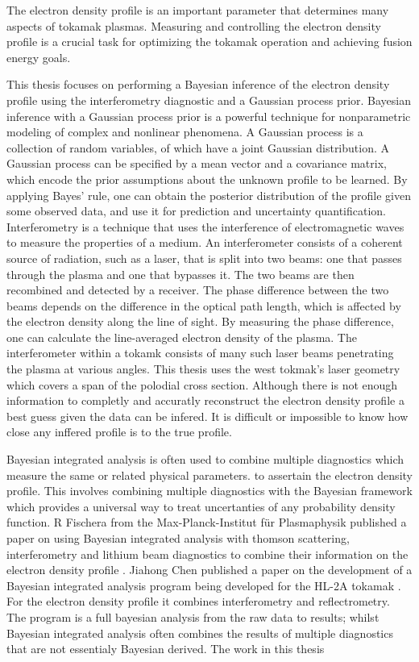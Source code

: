 The electron density profile is an important parameter that determines many aspects of tokamak plasmas. Measuring and controlling the electron density profile is a crucial task for optimizing the tokamak operation and achieving fusion energy goals.

This thesis focuses on performing a Bayesian inference of the electron density profile using the interferometry diagnostic and a Gaussian process prior. Bayesian inference with a Gaussian process prior is a powerful technique for nonparametric modeling of complex and nonlinear phenomena. A Gaussian process is a collection of random variables, of which have a joint Gaussian distribution. A Gaussian process can be specified by a mean vector and a covariance matrix, which encode the prior assumptions about the unknown profile to be learned. By applying Bayes’ rule, one can obtain the posterior distribution of the profile given some observed data, and use it for prediction and uncertainty quantification. Interferometry is a technique that uses the interference of electromagnetic waves to measure the properties of a medium. An interferometer consists of a coherent source of radiation, such as a laser, that is split into two beams: one that passes through the plasma and one that bypasses it. The two beams are then recombined and detected by a receiver. The phase difference between the two beams depends on the difference in the optical path length, which is affected by the electron density along the line of sight. By measuring the phase difference, one can calculate the line-averaged electron density of the plasma. The interferometer within a tokamk consists of many such laser beams penetrating the plasma at various angles. This thesis uses the \gls{west} tokmak's laser geometry which covers a span of the polodial cross section. Although there is not enough information to completly and accuratly reconstruct the electron density profile a best guess given the data can be infered. It is difficult or impossible to know how close any inffered profile is to the true profile.

Bayesian integrated analysis is often used to combine multiple diagnostics which measure the same or related physical parameters. to assertain the electron density profile. This involves combining multiple diagnostics with the Bayesian framework which provides a universal way to treat uncertanties of any probability density function. R Fischera from the Max-Planck-Institut für Plasmaphysik published a paper on using Bayesian integrated analysis with thomson scattering, interferometry and lithium beam diagnostics to combine their information on the electron density profile \cite{IDAmaxPlanck}. Jiahong Chen published a paper on the development of a Bayesian integrated analysis program being developed for the HL-2A tokamak \cite{IDAgeert2023}. For the electron density profile it combines interferometry and reflectrometry. The program is a full bayesian analysis from the raw data to results; whilst Bayesian integrated analysis often combines the results of multiple diagnostics that are not essentialy Bayesian derived. The work in this thesis 

